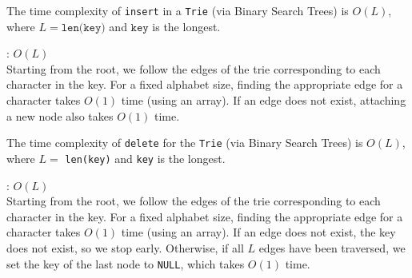 \documentclass[mathserif, handout]{beamer}
\begin{document}
\begin{frame}
  \begin{thmbox}
    The time complexity of \texttt{insert} in a \texttt{Trie} (via Binary Search Trees) is $O(L)$, where $L = \texttt{len(key)}$ and $\texttt{key}$ is the longest.
  \end{thmbox}
  \begin{proofbox}
    : \hfill $O(L)$ \\[1mm]
    \footnotesize\color{gray}
    Starting from the root, we follow the edges of the trie corresponding to each character in the key.
    For a fixed alphabet size, finding the appropriate edge for a character takes $O(1)$ time (using an array).
    If an edge does not exist, attaching a new node also takes $O(1)$ time.
  \end{proofbox}
\end{frame}

\begin{frame}
  \begin{thmbox}
    The time complexity of \texttt{delete} for the \texttt{Trie} (via Binary Search Trees) is $O(L)$, where $L = $ \texttt{len(key)} and \texttt{key} is the longest.
  \end{thmbox}
  \begin{proofbox}
    : \hfill $O(L)$ \\[1mm]
    \footnotesize\color{gray}
    Starting from the root, we follow the edges of the trie corresponding to each character in the key.
    For a fixed alphabet size, finding the appropriate edge for a character takes $O(1)$ time (using an array).
    If an edge does not exist, the key does not exist, so we stop early. Otherwise, if all $L$ edges have been traversed, we set the key of the last node to \texttt{NULL}, which takes $O(1)$ time.
  \end{proofbox}
\end{frame}
\end{document}
